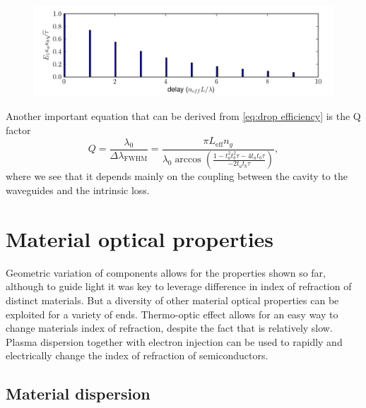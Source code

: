 \documentclass[12pt,twoside,english]{book}
\renewcommand{\~}{\perispomeni}%
\numberwithin{equation}{section}
\numberwithin{figure}{section}
\begin{document}
\begin{figure}
\centering \includegraphics{exp_decay}
\caption{\label{fig:exp decay}}
\end{figure}
Another important equation that can be derived from \ref{eq:drop efficiency} is the Q factor
\begin{equation}
Q=\frac{\lambda_{0}}{\Delta\lambda_{\text{FWHM}}}=\frac{\pi L_{\text{eff}}n_{g}}{\lambda_{0}\arccos\left(\frac{1-t_{a}^{2}t_{b}^{2}\tau-4t_{a}t_{b}\tau}{-2t_{a}t_{b}\tau}\right)},
\label{eq:Q}
\end{equation}
where we see that it depends mainly on the coupling between the cavity to the waveguides and the intrinsic loss.

\section{Material optical properties}

Geometric variation of components allows for the properties shown so far, although to guide light it was key to leverage difference in index of refraction of distinct materials. But a diversity of other material optical properties can be exploited for a variety of ends. Thermo-optic effect allows for an easy way to change materials index of refraction, despite the fact that is relatively slow. Plasma dispersion together with electron injection can be used to rapidly and electrically change the index of refraction of semiconductors. 

\subsection{Material dispersion}
\end{document}
